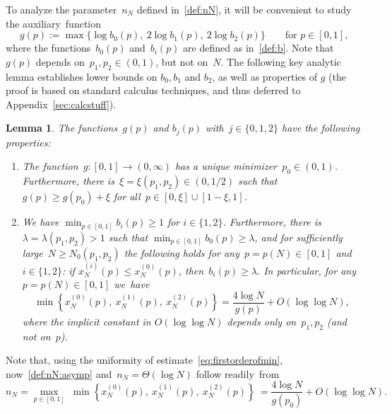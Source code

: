 \documentclass{article}
\newcommand{\xone}{x^{(1)}}
\newcommand{\xtwo}{x^{(2)}}
\newcommand{\xot}{x^{(0)}}
\newtheorem{lemma}[thm]{Lemma}
\newcommand\bigcpar[1]{\bigl\{#1\bigr\}}
\newenvironment{romenumerate}{\vspace{-0.25em}\begin{enumerate}\itemsep0pt \parskip0pt \parsep0pt\renewcommand{\labelenumi}{\textup{(\roman{enumi})}}\renewcommand{\theenumi}{\textup{(\roman{enumi})}}}{\vspace{-0.05em}\end{enumerate}\vspace{-0.05em}}
\begin{document}
To analyze the parameter~$n_N$ defined in~\eqref{def:nN}, it will be convenient to study the auxiliary~function
\begin{equation}\label{deg:gp}
g(p):=\max\bigcpar{\log b_0(p), \: 2\log b_1(p), \: 2\log b_2(p)} \qquad \text{for~$p \in [0,1]$,}
\end{equation}
where the functions~$b_0(p)$ and~$b_i(p)$ are defined as in~\eqref{def:b}. 
Note that~$g(p)$ 
depends on~$p_1,p_2 \in (0,1)$, but not on~$N$. 
The following key analytic lemma establishes lower bounds on $b_0,b_1$ and $b_2$, as well as properties of $g$ (the proof
is based on standard calculus techniques, and thus deferred to Appendix~\ref{sec:calcstuff}).
\begin{lemma}\label{lem:analytic}The functions~$g(p)$ and $b_j(p)$ with~$j \in \{0,1,2\}$ have the following properties:\begin{romenumerate}
    \item\label{item:approximate} The function~$g:[0,1] \to (0,\infty)$ has a unique minimizer~$p_0 \in (0,1)$.
    Furthermore, there is~$\xi=\xi(p_1,p_2) \in (0,1/2)$ such that $g(p)\ge  g(p_0) +\xi$ for all~${p\in [0,\xi]\cup [1-\xi,1]}$.
     \item\label{item:bounded} 
     We have $\min_{p\in [0,1]} b_i(p)\ge 1$ for $i\in \{1,2\}$.
     Furthermore, there is~$\lambda=\lambda(p_1,p_2)>1$ such that $\min_{p\in [0,1]} b_0(p) \ge \lambda$, 
		and for sufficiently large~$N \ge N_0(p_1,p_2)$  the following holds for any~${p=p(N) \in [0,1]}$ and $i\in \{1,2\}$: 
		if $x^{(i)}_N(p)\le x^{(0)}_N(p)$,  then~$b_i(p)\ge \lambda$.
     In particular, for any ${p=p(N)\in [0,1]}$ we~have 
		\begin{equation}\label{eq:firstorderofmin}
        \min\left\{\xot_N(p), \: \xone_N(p), \: \xtwo_N(p) \right\}= \frac{4\log N}{g(p)} + O(\log\log N) ,
\end{equation}
		where the implicit constant in $O(\log\log N)$ depends only on~$p_1,p_2$ (and not on~$p$).
\end{romenumerate}\vspace{-0.125em}\end{lemma}\noindent
Note that, using the uniformity of estimate~\eqref{eq:firstorderofmin}, now~\eqref{def:nN:asymp} and~$n_N = \Theta(\log N)$ follow readily~from 
\begin{equation}\label{eq:firstorderonN}
    n_N =\max_{p\in [0,1]} \; \min\left\{\xot_N(p), \: \xone_N(p), \: \xtwo_N(p) \right\} \
    = \frac{ 4\log N}{g(p_0)} + O(\log\log N) . 
\end{equation}
\end{document}
